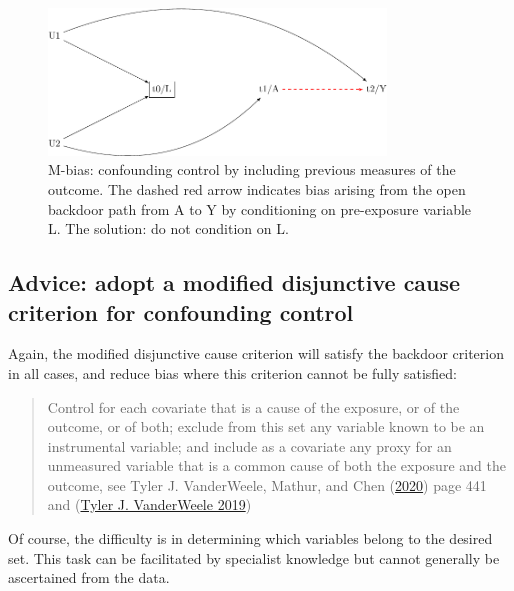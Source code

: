 \documentclass[
  singlecolumn]{report}
\begin{document}
\begin{figure}

{\centering \includegraphics[width=0.8\textwidth,height=\textheight]{causal-dags_files/figure-pdf/fig-m-bias-1.pdf}

}

\caption{\label{fig-m-bias}M-bias: confounding control by including
previous measures of the outcome. The dashed red arrow indicates bias
arising from the open backdoor path from A to Y by conditioning on
pre-exposure variable L. The solution: do not condition on L.}

\end{figure}

\hypertarget{advice-adopt-a-modified-disjunctive-cause-criterion-for-confounding-control}{%
\subsection{Advice: adopt a modified disjunctive cause criterion for
confounding
control}\label{advice-adopt-a-modified-disjunctive-cause-criterion-for-confounding-control}}

Again, the modified disjunctive cause criterion will satisfy the
backdoor criterion in all cases, and reduce bias where this criterion
cannot be fully satisfied:

\begin{quote}
Control for each covariate that is a cause of the exposure, or of the
outcome, or of both; exclude from this set any variable known to be an
instrumental variable; and include as a covariate any proxy for an
unmeasured variable that is a common cause of both the exposure and the
outcome, see Tyler J. VanderWeele, Mathur, and Chen
(\protect\hyperlink{ref-vanderweele2020}{2020}) page 441 and
(\protect\hyperlink{ref-vanderweele2019a}{Tyler J. VanderWeele 2019})
\end{quote}

Of course, the difficulty is in determining which variables belong to
the desired set. This task can be facilitated by specialist knowledge
but cannot generally be ascertained from the data.
\end{document}
